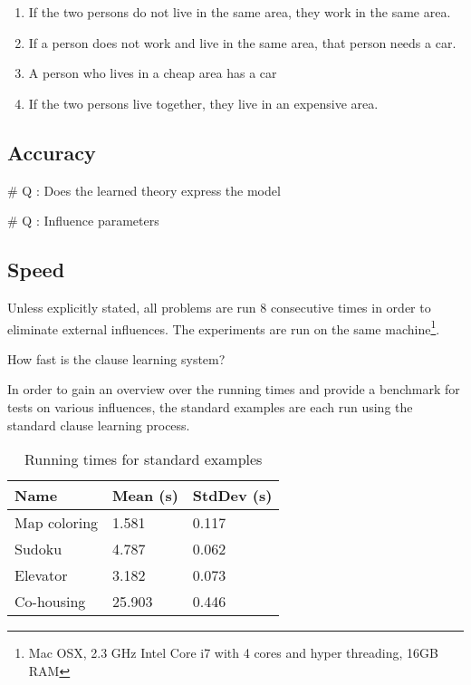 \begin{enumerate}
	\item If the two persons do not live in the same area, they work in the same area.
	\item If a person does not work and live in the same area, that person needs a car.
	\item A person who lives in a cheap area has a car
	\item If the two persons live together, they live in an expensive area.
\end{enumerate}

\subsection{Accuracy}

\# Q : Does the learned theory express the model

\# Q : Influence parameters

\subsection{Speed}

Unless explicitly stated, all problems are run $8$ consecutive times in order to eliminate external influences.
The experiments are run on the same machine\footnote{Mac OSX, 2.3 GHz Intel Core i7 with 4 cores and hyper threading, 16GB RAM}.

\begin{question}
	How fast is the clause learning system?
\end{question}

\begin{experiment}
	In order to gain an overview over the running times and provide a benchmark for tests on various influences, the standard examples are each run using the standard clause learning process.
	
	\begin{table}[!htp]
		\begin{tabularx}{\textwidth}{XXX}
			\textbf{Name}	& \textbf{Mean (s)}	& \textbf{StdDev (s)} \\
			\toprule
			Map coloring 	& 1.581				& 0.117 \\
			Sudoku 			& 4.787				& 0.062 \\
			Elevator 		& 3.182 			& 0.073 \\
			Co-housing 		& 25.903			& 0.446
		\end{tabularx}
		\label{tbl:exp_speed_standard}
		\caption{Running times for standard examples}
	\end{table}

\end{experiment}


